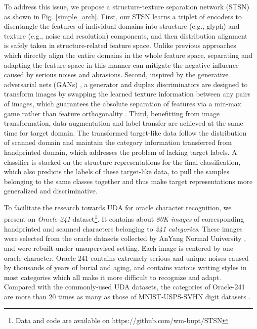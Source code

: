 \documentclass[10pt,journal,compsoc,twocolumn ]{IEEEtran}
\begin{document}
To address this issue, we propose a structure-texture separation network (STSN) as shown in Fig. \ref{simple_arch}. First, our STSN learns a triplet of encoders to disentangle the features of individual domains into structure (e.g., glyph) and texture (e.g., noise and resolution) components, and then distribution alignment is safely taken in structure-related feature space. Unlike previous approaches \cite{Ganin2015Unsupervised,Long2015Learning} which directly align the entire domains in the whole feature space, separating and adapting the feature space in this manner can mitigate the negative influence caused by serious noises and abrasions. Second, inspired by the generative adversarial nets (GANs) \cite{goodfellow2014generative}, a generator and duplex discriminators are designed to transform images by swapping the learned texture information between any pairs of images, which guarantees the absolute separation of features via a min-max game rather than feature orthogonality \cite{bousmalis2016domain}. Third, benefitting from image transformation, data augmentation and label transfer are achieved at the same time for target domain. The transformed target-like data follow the distribution of scanned domain and maintain the category information transferred from handprinted domain, which addresses the problem of lacking target labels. A classifier is stacked on the structure representations for the final classification, which also predicts the labels of these target-like data, to pull the samples belonging to the same classes together and thus make target representations more generalized and discriminative.

To facilitate the research towards UDA for oracle character recognition, we present an \textit{Oracle-241} dataset\footnote{Data and code are available on https://github.com/wm-bupt/STSN}. It contains about \textit{80K images} of corresponding handprinted and scanned characters belonging to \textit{241 categories}. These images were selected from the oracle datasets collected by AnYang Normal University \cite{anyang}, and were rebuilt under unsupervised setting. Each image is centered by one oracle character. Oracle-241 contains extremely serious and unique noises caused by thousands of years of burial and aging, and contains various writing styles in most categories which all make it more difficult to recognize and adapt. Compared with the commonly-used UDA datasets, the categories of Oracle-241 are more than 20 times as many as those of MNIST-USPS-SVHN digit datasets \cite{lecun1998gradient,netzer2011reading,denker1989neural}.
\end{document}
